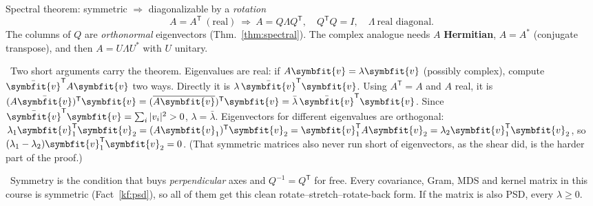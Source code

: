 \documentclass[11pt]{article}
\newcommand{\bm}[1]{\symbfit{#1}}
\newcounter{keyfact}
\newcommand{\why}{\par\smallskip{\color{intgreen}\textbf{Why.}}\ }
\newcommand{\sowhat}{\par\smallskip{\color{corpurple}\textbf{So what.}}\ }
\newcommand{\T}{^{\mathsf T}}
\begin{document}
\begin{keyfactbox}{Spectral theorem: symmetric $\Rightarrow$ diagonalizable by a \emph{rotation}}\label{kf:spectral}
\[
\boxed{A=A\T\ (\text{real})\ \Longrightarrow\ A=Q\Lambda Q\T,\quad Q\T Q=I,\quad \Lambda\ \text{real diagonal}.}
\]
The columns of $Q$ are \emph{orthonormal} eigenvectors (Thm.~\ref{thm:spectral}). The complex analogue needs
$A$ \textbf{Hermitian}, $A=A^*$ (conjugate transpose), and then $A=U\Lambda U^*$ with $U$ unitary.
\why Two short arguments carry the theorem. Eigenvalues are real: if $A\bm v=\lambda\bm v$ (possibly complex), compute $\bar{\bm v}\T A\bm v$ two ways. Directly it is
$\lambda\,\bar{\bm v}\T\bm v$. Using $A\T=A$ and $A$ real, it is $(A\bar{\bm v})\T\bm v=(\overline{A\bm v})\T\bm v=\bar\lambda\,\bar{\bm v}\T\bm v$. Since
$\bar{\bm v}\T\bm v=\sum_i|v_i|^2>0$, $\lambda=\bar\lambda$. Eigenvectors for different
eigenvalues are orthogonal: $\lambda_1\bm v_1\T\bm v_2=(A\bm v_1)\T\bm v_2=\bm v_1\T A\bm v_2=\lambda_2\bm v_1\T\bm v_2$, so
$(\lambda_1-\lambda_2)\bm v_1\T\bm v_2=0$. (That symmetric matrices also never run short of eigenvectors, as the shear did,
is the harder part of the proof.)
\sowhat Symmetry is the condition that buys \emph{perpendicular} axes and $Q^{-1}=Q\T$ for free. Every covariance,
Gram, MDS and kernel matrix in this course is symmetric (Fact~\ref{kf:psd}), so all of them get this clean
rotate--stretch--rotate-back form. If the matrix is also PSD, every $\lambda\ge0$.
\end{keyfactbox}
\end{document}
